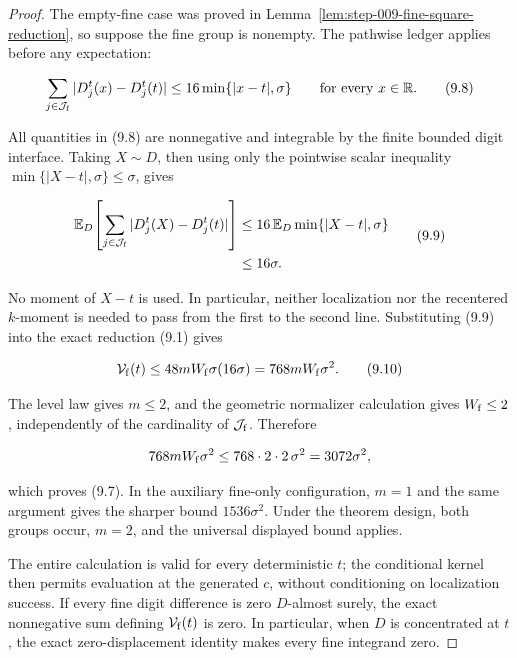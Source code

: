 \begin{proof}
The empty-fine case was proved in
Lemma~\ref{lem:step-009-fine-square-reduction}, so suppose the fine group
is nonempty. The pathwise ledger applies before any expectation:

\[
\sum_{j\in\mathcal J_{\rm f}}
|D_j^t(x)-D_j^t(t)|
\leq16\min\{|x-t|,\sigma\}
\qquad\text{for every }x\in\mathbb R.
\tag{9.8}
\]

All quantities in (9.8) are nonnegative and integrable by the finite bounded
digit interface. Taking \(X\sim D\), then using only the pointwise scalar
inequality \(\min\{|X-t|,\sigma\}\leq\sigma\), gives

\[
\begin{aligned}
\mathbb E_D\!\left[
\sum_{j\in\mathcal J_{\rm f}}
|D_j^t(X)-D_j^t(t)|
\right]
&\leq16\,\mathbb E_D\min\{|X-t|,\sigma\}\\
&\leq16\sigma.
\end{aligned}
\tag{9.9}
\]

No moment of \(X-t\) is used. In particular, neither localization nor the
recentered \(k\)-moment is needed to pass from the first to the second line.
Substituting (9.9) into the exact reduction (9.1) gives

\[
\mathcal V_{\rm f}(t)
\leq48mW_{\rm f}\sigma(16\sigma)
=768mW_{\rm f}\sigma^2.
\tag{9.10}
\]

The level law gives \(m\leq2\), and the geometric
normalizer calculation gives \(W_{\rm f}\leq2\), independently of the
cardinality of \(\mathcal J_{\rm f}\). Therefore

\[
768mW_{\rm f}\sigma^2
\leq768\cdot2\cdot2\,\sigma^2
=3072\sigma^2,
\]

which proves (9.7). In the auxiliary fine-only configuration, \(m=1\) and the
same argument gives the sharper bound \(1536\sigma^2\). Under the theorem
design, both groups occur, \(m=2\), and the universal displayed bound applies.

The entire calculation is valid for every deterministic \(t\); the conditional kernel then permits evaluation at the generated \(c\), without
conditioning on localization success. If every fine digit difference is zero
\(D\)-almost surely, the exact nonnegative sum defining
\(\mathcal V_{\rm f}(t)\) is zero. In particular, when \(D\) is concentrated
at \(t\), the exact zero-displacement identity makes every fine
integrand zero.
\end{proof}

